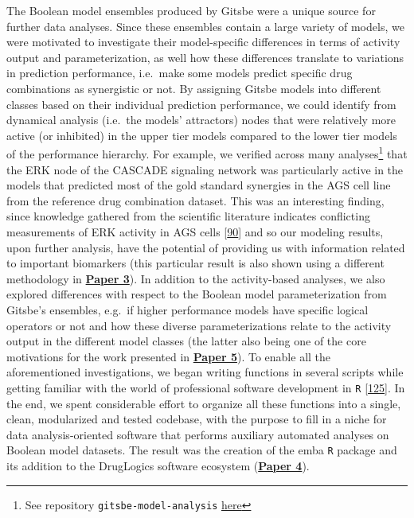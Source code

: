 \documentclass[
  12pt,
]{book}
\begin{document}
The Boolean model ensembles produced by Gitsbe were a unique source for further data analyses.
Since these ensembles contain a large variety of models, we were motivated to investigate their model-specific differences in terms of activity output and parameterization, as well how these differences translate to variations in prediction performance, i.e.~make some models predict specific drug combinations as synergistic or not.
By assigning Gitsbe models into different classes based on their individual prediction performance, we could identify from dynamical analysis (i.e.~the models' attractors) nodes that were relatively more active (or inhibited) in the upper tier models compared to the lower tier models of the performance hierarchy.
For example, we verified across many analyses\footnote{See repository \texttt{gitsbe-model-analysis} \protect\hyperlink{misc-links}{here}} that the ERK node of the CASCADE signaling network was particularly active in the models that predicted most of the gold standard synergies in the AGS cell line from the reference drug combination dataset.
This was an interesting finding, since knowledge gathered from the scientific literature indicates conflicting measurements of ERK activity in AGS cells {[}\protect\hyperlink{ref-Flobak2015}{90}{]} and so our modeling results, upon further analysis, have the potential of providing us with information related to important biomarkers (this particular result is also shown using a different methodology in \textbf{\protect\hyperlink{Paper3}{Paper 3}}).
In addition to the activity-based analyses, we also explored differences with respect to the Boolean model parameterization from Gitsbe's ensembles, e.g.~if higher performance models have specific logical operators or not and how these diverse parameterizations relate to the activity output in the different model classes (the latter also being one of the core motivations for the work presented in \textbf{\protect\hyperlink{Paper5}{Paper 5}}).
To enable all the aforementioned investigations, we began writing functions in several scripts while getting familiar with the world of professional software development in \texttt{R} {[}\protect\hyperlink{ref-Wickham2015}{125}{]}.
In the end, we spent considerable effort to organize all these functions into a single, clean, modularized and tested codebase, with the purpose to fill in a niche for data analysis-oriented software that performs auxiliary automated analyses on Boolean model datasets.
The result was the creation of the emba \texttt{R} package and its addition to the DrugLogics software ecosystem (\textbf{\protect\hyperlink{Paper4}{Paper 4}}).
\end{document}
